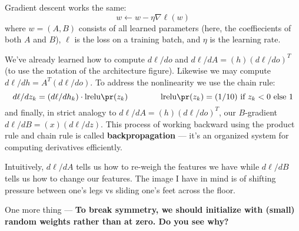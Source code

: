   Gradient descent works the same:
  $$
    w \leftarrow w - \eta \nabla \ell(w)
  $$
  where $w=(A,B)$ consists of all learned parameters (here, the coeffiecients
  of both $A$ and $B$), $\ell$ is the loss on a training batch, and $\eta$ is
  the learning rate.

  We've already learned how to compute $d\ell/do$ and $d\ell/dA =
  (h)(d\ell/do)^T$ (to use the notation of the architecture figure).
  Likewise we may compute $d\ell/dh = A^T(d\ell/do)$.  To address the nonlinearity
  we use the chain rule:
  $$
    d\ell/dz_k = (d\ell/dh_k) \cdot \text{lrelu}\pr(z_k)
    \quad\quad\quad\quad
    \text{lrelu}\pr(z_k) = (1/10)\text{~if $z_k<0$ else~}1
  $$
  and finally, in strict analogy to $d\ell/dA =
  (h)(d\ell/do)^T$, our $B$-gradient $d\ell/dB = (x)(d\ell/dz)$.
  This process of working backward using the product rule and chain rule
  is called \textbf{backpropagation} --- it's an organized system for computing
  derivatives efficiently.

  Intuitively, $d\ell/dA$ tells us how to re-weigh the features we have
  while $d\ell/dB$ tells us how to change our features.  The image I have in
  mind is of shifting pressure between one's legs vs sliding one's feet across
  the floor.

  One more thing --- \textbf{To break symmetry, we should initialize with
  (small) random weights rather than at zero.  Do you see why?}

